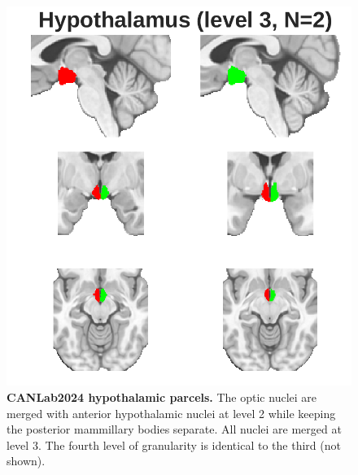 \documentclass[10pt,letterpaper]{article}
\begin{document}
\begin{figure}[t]
\begin{minipage}{0.33\linewidth}
\end{minipage}\hfill
\begin{minipage}{0.33\linewidth}
\includegraphics[width=\linewidth]{images/ht_coarser.png}
\end{minipage}\hfill
\caption{
{\bf
CANLab2024 hypothalamic parcels.} The optic nuclei are merged with anterior hypothalamic nuclei at level 2 while keeping the posterior mammillary bodies separate. All nuclei are merged at level 3. The fourth level of granularity is identical to the third (not shown).
}
\label{hypothal-granularities-figure}
\end{figure}
\end{document}

